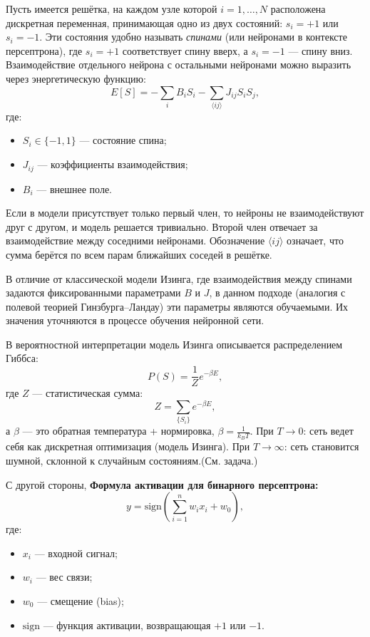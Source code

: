 \begin{description}
Пусть имеется решётка, на каждом узле которой $i = 1, \dots, N$ расположена дискретная переменная, принимающая одно из двух состояний: $s_i = +1$ или $s_i = -1$. Эти состояния удобно называть \textit{спинами} (или нейронами в контексте персептрона), где $s_i = +1$ соответствует спину вверх, а $s_i = -1$ — спину вниз. 
Взаимодействие отдельного нейрона с остальными нейронами можно выразить через энергетическую функцию:
\[
E[S] = - \sum_i B_i S_i -\sum_{\langle i j \rangle} J_{ij} S_i S_j,
\]
где:
\begin{itemize}
    \item $S_i \in \{-1, 1\}$ — состояние спина;
    \item $J_{ij}$ — коэффициенты взаимодействия;
    \item $B_i$ — внешнее поле.
\end{itemize}
Если в модели присутствует только первый член, то нейроны не взаимодействуют друг с другом, и модель решается тривиально. Второй член отвечает за взаимодействие между соседними нейронами. Обозначение $\langle i j \rangle$ означает, что сумма берётся по всем парам ближайших соседей в решётке.

В отличие от классической модели Изинга, где взаимодействия между спинами задаются фиксированными параметрами $B$ и $J$, в данном подходе (аналогия с полевой теорией Гинзбурга–Ландау) эти параметры являются обучаемыми. Их значения уточняются в процессе обучения нейронной сети.

В вероятностной интерпретации модель Изинга описывается распределением Гиббса:
\[
P(S) = \frac{1}{Z} e^{-\beta E},
\]
где $Z$ — статистическая сумма:
\[
Z = \sum_{\{S_i\}} e^{-\beta E},
\]
а $\beta$ — это обратная температура 
 + нормировка, $\beta = \frac{1}{k_B T}$. При 
$T\rightarrow0$: сеть ведет себя как дискретная оптимизация (модель Изинга).
При $T \rightarrow \infty$: сеть становится шумной, склонной к случайным состояниям.(См. задача.)

С другой стороны, \textbf{Формула активации для бинарного персептрона:}
\[
y = \mathrm{sign}\left(\sum_{i=1}^n w_i x_i + w_0\right),
\]
где:
\begin{itemize}
    \item $x_i$ — входной сигнал;
    \item $w_i$ — вес связи;
    \item $w_0$ — смещение (bias);
    \item $\mathrm{sign}$ — функция активации, возвращающая $+1$ или $-1$.
\end{itemize}


\end{description}
